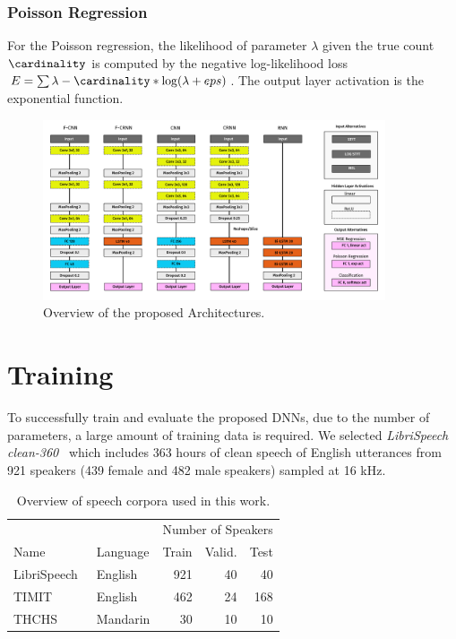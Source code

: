 \subsubsection{Poisson Regression}
For the Poisson regression, the likelihood of parameter \(\lambda \) given the true count \(\cardinality \) is computed by the negative log-likelihood loss \(E = \sum \lambda - \cardinality * \log(\lambda + eps)\). The output layer activation is the exponential function.

%
\begin{figure}[tb]
\centering
\includegraphics[width=0.9\textwidth]{Chapters/08_Analysis_CountNet/figures/networkoverview.pdf}
\caption{Overview of the proposed Architectures.}%
\label{fig:networkoverview}%
\end{figure}

\section{Training}%
\label{sec:training}

To successfully train and evaluate the proposed DNNs, due to the number of parameters, a large amount of training data is required.
We selected \emph{LibriSpeech clean-360}\ \cite{panayotov15} which includes 363 hours of clean speech of English utterances from 921 speakers (439 female and 482 male speakers) sampled at 16 kHz.

\begin{table}
  \centering
  \caption{Overview of speech corpora used in this work.}%
\label{tab:corpora}
\begin{tabular}{llrrr}
  \toprule
  & & \multicolumn{3}{c}{Number of Speakers} \\
  \cmidrule(r){3-5}
  Name & Language &  Train & Valid. & Test\\
  \midrule
  LibriSpeech~\cite{panayotov15} & English & 921 & 40 & 40 \\
  TIMIT~\cite{TIMIT93} & English & 462 & 24 & 168 \\
  THCHS~\cite{THCHS15} & Mandarin & 30 & 10 & 10 \\
  \bottomrule
  \end{tabular}
\end{table}


